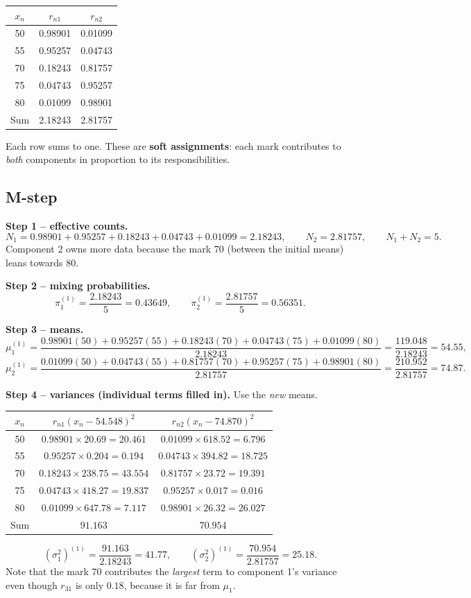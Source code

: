 \documentclass[11pt,a4paper]{article}
\begin{document}
\begin{center}
\begin{tabular}{@{}ccc@{}}
\toprule
$x_n$ & $r_{n1}$ & $r_{n2}$\\
\midrule
50 & 0.98901 & 0.01099\\
55 & 0.95257 & 0.04743\\
70 & 0.18243 & 0.81757\\
75 & 0.04743 & 0.95257\\
80 & 0.01099 & 0.98901\\
\midrule
Sum & 2.18243 & 2.81757\\
\bottomrule
\end{tabular}
\end{center}
Each row sums to one. These are \textbf{soft assignments}: each mark contributes to \emph{both} components in proportion to its responsibilities.

\subsection{M-step}

\textbf{Step 1 -- effective counts.}
\[
N_1=0.98901+0.95257+0.18243+0.04743+0.01099=2.18243,\qquad N_2=2.81757,\qquad N_1+N_2=5.
\]
Component 2 owns more data because the mark $70$ (between the initial means) leans towards $80$.

\textbf{Step 2 -- mixing probabilities.}
\[
\pi_1^{(1)}=\frac{2.18243}{5}=0.43649,\qquad\pi_2^{(1)}=\frac{2.81757}{5}=0.56351.
\]

\textbf{Step 3 -- means.}
\[
\mu_1^{(1)}=\frac{0.98901(50)+0.95257(55)+0.18243(70)+0.04743(75)+0.01099(80)}{2.18243}=\frac{119.048}{2.18243}=54.55,
\]
\[
\mu_2^{(1)}=\frac{0.01099(50)+0.04743(55)+0.81757(70)+0.95257(75)+0.98901(80)}{2.81757}=\frac{210.952}{2.81757}=74.87.
\]

\textbf{Step 4 -- variances (individual terms filled in).} Use the \emph{new} means.
\begin{center}
\begin{tabular}{@{}ccc@{}}
\toprule
$x_n$ & $r_{n1}(x_n-54.548)^2$ & $r_{n2}(x_n-74.870)^2$\\
\midrule
50 & $0.98901\times20.69=20.461$ & $0.01099\times618.52=6.796$\\
55 & $0.95257\times0.204=0.194$ & $0.04743\times394.82=18.725$\\
70 & $0.18243\times238.75=43.554$ & $0.81757\times23.72=19.391$\\
75 & $0.04743\times418.27=19.837$ & $0.95257\times0.017=0.016$\\
80 & $0.01099\times647.78=7.117$ & $0.98901\times26.32=26.027$\\
\midrule
Sum & $91.163$ & $70.954$\\
\bottomrule
\end{tabular}
\end{center}
\[
(\sigma_1^2)^{(1)}=\frac{91.163}{2.18243}=41.77,\qquad(\sigma_2^2)^{(1)}=\frac{70.954}{2.81757}=25.18.
\]
Note that the mark $70$ contributes the \emph{largest} term to component 1's variance even though $r_{31}$ is only $0.18$, because it is far from $\mu_1$.
\end{document}

